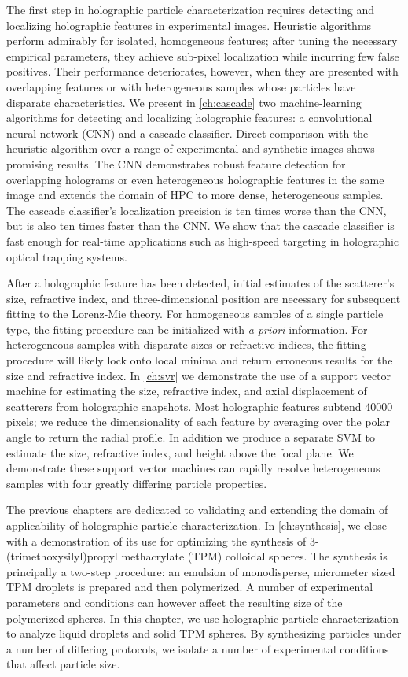 The first step in holographic particle characterization
requires detecting and localizing holographic features in experimental
images. Heuristic algorithms perform admirably for isolated, homogeneous
features; after tuning the necessary empirical parameters, they achieve
sub-pixel localization while incurring few false positives. Their
performance deteriorates, however, when they are presented with overlapping
features or with heterogeneous samples whose particles have disparate
characteristics. We present in \autoref{ch:cascade} two machine-learning
algorithms for detecting and localizing holographic features: a convolutional
neural network (CNN) and a cascade classifier. Direct comparison with the
heuristic algorithm over a range of experimental and synthetic images
shows promising results. The CNN demonstrates robust feature detection
for overlapping holograms or even heterogeneous holographic features
in the same image and extends the domain of HPC to more dense, heterogeneous
samples. The cascade classifier's localization precision
is ten times worse than the CNN, but is also ten times faster than
the CNN. We show that the cascade classifier is fast enough for real-time
applications such as high-speed targeting in holographic optical
trapping systems.

After a holographic feature has been detected, initial estimates of the
scatterer's size, refractive index, and three-dimensional position
are necessary for subsequent fitting to the Lorenz-Mie theory.
For homogeneous samples of a single particle type, the fitting procedure
can be initialized with \emph{a priori} information. For heterogeneous samples
with disparate sizes or refractive indices, the fitting procedure
will likely lock onto local minima and return erroneous results for
the size and refractive index.
In \autoref{ch:svr} we demonstrate the use of a support vector machine for
estimating the size, refractive index, and axial displacement of scatterers
from holographic snapshots. Most holographic features subtend \SI{40000}{} pixels;
we reduce the dimensionality of each feature by averaging over the polar
angle to return the radial profile. In addition we produce a separate SVM to
estimate the size, refractive index, and height above the focal plane.
We demonstrate these support vector machines can rapidly resolve heterogeneous
samples with four greatly differing particle properties.

The previous chapters are dedicated to validating and extending
the domain of applicability of holographic particle characterization.
In \autoref{ch:synthesis}, we close with a demonstration of its use for
optimizing the synthesis of 3-(trimethoxysilyl)propyl methacrylate (TPM)
colloidal spheres. The synthesis is principally a two-step procedure:
an emulsion of monodisperse, micrometer sized TPM droplets is prepared
and then polymerized. A number of experimental parameters and conditions
can however affect the resulting size of the polymerized spheres. In this
chapter, we use holographic particle characterization to analyze
liquid droplets and solid TPM spheres. By synthesizing particles under a
number of differing protocols, we isolate a number of experimental conditions
that affect particle size.
